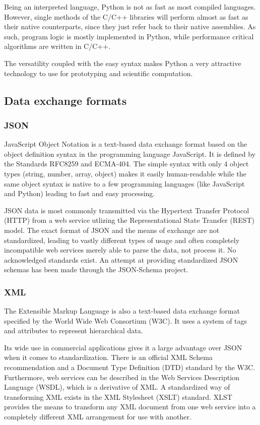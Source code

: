 \documentclass[BSA,Bachelor,english]{twbook}%
\begin{document}
Being an interpreted language, Python is not as fast as most compiled languages. However, single methods of the C/C++ libraries will perform almost as fast as their native counterparts, since they just refer back to their native assemblies. As such, program logic is mostly implemented in Python, while performance critical algorithms are written in C/C++.

The versatility coupled with the easy syntax makes Python a very attractive technology to use for prototyping and scientific computation.

\subsection{Data exchange formats}

\subsubsection{JSON}

JavaScript Object Notation is a text-based data exchange format based on the object definition syntax in the programming language JavaScript. It is defined by the Standards RFC8259\cite{RFC8259} and ECMA-404\cite{ECMA404}. The simple syntax with only 4 object types (string, number, array, object) makes it easily human-readable while the same object syntax is native to a few programming languages (like JavaScript and Python) leading to fast and easy processing.

JSON data is most commonly transmitted via the Hypertext Transfer Protocol (HTTP) from a web service utlizing the Representational State Transfer (REST) model. The exact format of JSON and the means of exchange are not standardized, leading to vastly different types of usage and often completely incompatible web services merely able to parse the data, not process it. No acknowledged standards exist. An attempt at providing standardized JSON schemas has been made through the JSON-Schema project\cite{JSON_SCHEMA}.

\subsubsection{XML}

The Extensible Markup Language is also a text-based data exchange format specified\cite{XML} by the World Wide Web Consortium (W3C). It uses a system of tags and attributes to represent hierarchical data.

Its wide use in commercial applications gives it a large advantage over JSON when it comes to standardization. There is an official XML Schema recommendation and a Document Type Definition (DTD) standard by the W3C. Furthermore, web services can be described in the Web Services Description Language (WSDL), which is a derivative of XML. A standardized way of transforming XML exists in the XML Stylesheet (XSLT) standard. XLST provides the means to transform any XML document from one web service into a completely different XML arrangement for use with another.
\end{document}
